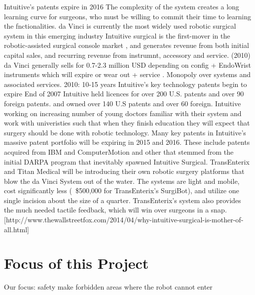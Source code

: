 Intuitive's patents expire in 2016 \citep{bib:intuitive_monopoly}
The complexity of the system creates a long learning curve for surgeons, who must be willing to commit their time to learning the fnctionalities.
da Vinci is currently the most widely used robotic surgical system in this emerging industry \citep{bib:intuitive_monopoly}
Intuitive surgical is the first-mover in the robotic-assisted surgical console market \citep{bib:intuitive_monopoly}, and generates revenue from both initial capital sales, and recurring revenue from instrumnt, accessory and service.
(2010) da Vinci generally sells for 0.7-2.3 million USD depending on config + EndoWrist instruments which will expire or wear out + service \citep{bib:intuitive_monopoly}. Monopoly over systems and associated services.
2010: 10-15 years Intuitive's key technology patents begin to expire \citep{bib:intuitive_monopoly}
End of 2007 Intuitive held licences for over 200 U.S. patents and over 90 foreign patents. and owned over 140 U.S patents and over 60 foreign.
Intuitive working on increasing number of young doctors familiar with their system and work with univeristies such that when they finish education they will expect that surgery should be done with robotic technology. \citep{bib:intuitive_monopoly}
Many key patents in Intuitive's massive patent portfolio will be expiring in 2015 and 2016. These include patents acquired from IBM and ComputerMotion and other that stemmed from the initial DARPA program that inevitably spawned Intuitive Surgical. TransEnterix and Titan Medical will be introducing their own robotic surgery platforms that blow the da Vinci System out of the water. The systems are light and mobile, cost significantly less (~\$500,000 for TransEnterix's SurgiBot), and utilize one single incision about the size of a quarter. TransEnterix's system also provides the much needed tactile feedback, which will win over surgeons in a snap. [http://www.thewallstreetfox.com/2014/04/why-intuitive-surgical-is-mother-of-all.html]


\section{Focus of this Project}
Our focus:
safety
make forbidden areas where the robot cannot enter

